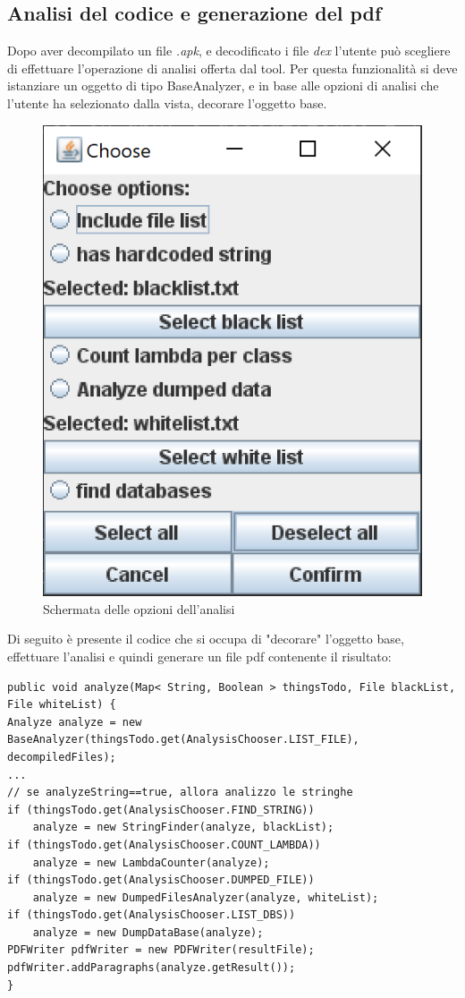 \subsection{Analisi del codice e generazione del pdf}\label{subsec:analisi-del-codice-e-generazione-del-pdf}
Dopo aver decompilato un file \textit{.apk}, e decodificato i file \textit{dex} l'utente può scegliere di effettuare l'operazione di analisi offerta dal tool.
Per questa funzionalità si deve istanziare un oggetto di tipo BaseAnalyzer, e in base alle opzioni di analisi che l'utente ha selezionato dalla vista, decorare l'oggetto base.
\begin{figure}[H]
    \centering
    \includegraphics{./immagini/tool/analysis_chooser.png}
    \caption{Schermata delle opzioni dell'analisi}\label{fig:analysis_chooser}
\end{figure}
Di seguito è presente il codice che si occupa di "decorare" l'oggetto base, effettuare l'analisi e quindi generare un file pdf contenente il risultato:


\begin{lstlisting}[caption={Decorator},label={lst:analyze}]
public void analyze(Map< String, Boolean > thingsTodo, File blackList, File whiteList) {
Analyze analyze = new BaseAnalyzer(thingsTodo.get(AnalysisChooser.LIST_FILE), decompiledFiles);
...
// se analyzeString==true, allora analizzo le stringhe
if (thingsTodo.get(AnalysisChooser.FIND_STRING))
    analyze = new StringFinder(analyze, blackList);
if (thingsTodo.get(AnalysisChooser.COUNT_LAMBDA))
    analyze = new LambdaCounter(analyze);
if (thingsTodo.get(AnalysisChooser.DUMPED_FILE))
    analyze = new DumpedFilesAnalyzer(analyze, whiteList);
if (thingsTodo.get(AnalysisChooser.LIST_DBS))
    analyze = new DumpDataBase(analyze);
PDFWriter pdfWriter = new PDFWriter(resultFile);
pdfWriter.addParagraphs(analyze.getResult());
}
\end{lstlisting}

